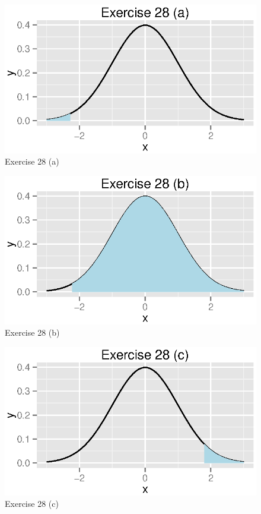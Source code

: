 \documentclass{exam}
\begin{document}
\begin{description}
        \begin{figure}[H]
          \centering
          \includegraphics{figures/ex28a.eps}
          \caption{Exercise 28 (a)}
        \end{figure}

        \begin{figure}[H]
          \centering
          \includegraphics{figures/ex28b.eps}
          \caption{Exercise 28 (b)}
        \end{figure}

        \begin{figure}[H]
          \centering
          \includegraphics{figures/ex28c.eps}
          \caption{Exercise 28 (c)}
        \end{figure}


\end{description}
\end{document}

